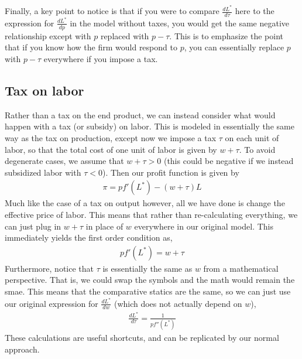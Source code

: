 Finally, a key point to notice is that if you were to compare $\frac{dL^*}{d\tau}$ here to the expression for $\frac{dL^*}{dp}$ in the model without taxes, you would get the same negative relationship except with $p$ replaced with $p - \tau$. This is to emphasize the point that if you know how the firm would respond to $p$, you can essentially replace $p$ with $p - \tau$ everywhere if you impose a tax. 

\subsection*{Tax on labor}
Rather than a tax on the end product, we can instead consider what would happen with a tax (or subsidy) on labor. This is modeled in essentially the same way as the tax on production, except now we impose a tax $\tau$ on each unit of labor, so that the total cost of one unit of labor is given by $w + \tau$. To avoid degenerate cases, we assume that $w + \tau > 0$ (this could be negative if we instead subsidized labor with $\tau < 0$). Then our profit function is given by
\begin{align*}
    \pi = p f'(L^*) - (w + \tau) L
\end{align*}
Much like the case of a tax on output however, all we have done is change the effective price of labor. This means that rather than re-calculating everything, we can just plug in $w + \tau$ in place of $w$ everywhere in our original model. This immediately yields the first order condition as,
\begin{align*}
    p f'(L^*) = w + \tau
\end{align*}
Furthermore, notice that $\tau$ is essentially the same as $w$ from a mathematical perspective. That is, we could swap the symbols and the math would remain the smae. This means that the comparative statics are the same, so we can just use our original expression for $\frac{dL^*}{dw}$ (which does not actually depend on $w$),
\begin{align*}
    \frac{dL^*}{d\tau}= \frac{1}{pf''(L^*)}
\end{align*}
These calculations are useful shortcuts, and can be replicated by our normal approach. 

